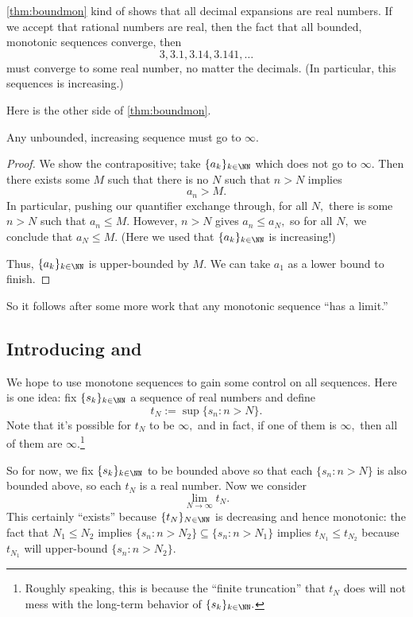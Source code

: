 \begin{remark}
	\autoref{thm:boundmon} kind of shows that all decimal expansions are real numbers. If we accept that rational numbers are real, then the fact that all bounded, monotonic sequences converge, then
	\[3,3.1,3.14,3.141,\ldots\]
	must converge to some real number, no matter the decimals. (In particular, this sequences is increasing.)
\end{remark}
Here is the other side of \autoref{thm:boundmon}.
\begin{proposition}
	Any unbounded, increasing sequence must go to $\infty.$
\end{proposition}
\begin{proof}
	We show the contrapositive; take $\{a_k\}_{k\in\NN}$ which does not go to $\infty.$ Then there exists some $M$ such that there is no $N$ such that $n>N$ implies
	\[a_n>M.\]
	In particular, pushing our quantifier exchange through, for all $N,$ there is some $n>N$ such that $a_n\le M.$ However, $n>N$ gives $a_n\le a_N,$ so for all $N,$ we conclude that $a_N\le M.$ (Here we used that $\{a_k\}_{k\in\NN}$ is increasing!)
	
	Thus, $\{a_k\}_{k\in\NN}$ is upper-bounded by $M.$ We can take $a_1$ as a lower bound to finish.
\end{proof}
So it follows after some more work that any monotonic sequence ``has a limit.''

\subsection{Introducing  and }
We hope to use monotone sequences to gain some control on all sequences. Here is one idea: fix $\{s_k\}_{k\in\NN}$ a sequence of real numbers and define
\[t_N:=\sup\{s_n:n>N\}.\]
Note that it's possible for $t_N$ to be $\infty,$ and in fact, if one of them is $\infty,$ then all of them are $\infty.$\footnote{Roughly speaking, this is because the ``finite truncation'' that $t_N$ does will not mess with the long-term behavior of $\{s_k\}_{k\in\NN}.$}

So for now, we fix $\{s_k\}_{k\in\NN}$ to be bounded above so that each $\{s_n:n>N\}$ is also bounded above, so each $t_N$ is a real number. Now we consider
\[\lim_{N\to\infty}t_N.\]
This certainly ``exists'' because $\{t_N\}_{N\in\NN}$ is decreasing and hence monotonic: the fact that $N_1\le N_2$ implies $\{s_n:n>N_2\}\subseteq\{s_n:n>N_1\}$ implies $t_{N_1}\le t_{N_2}$ because $t_{N_1}$ will upper-bound $\{s_n:n>N_2\}.$

